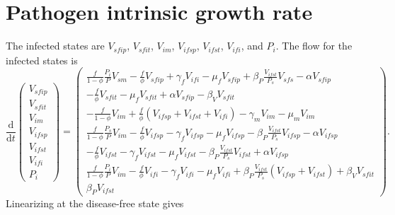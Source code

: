 \documentclass{article}
\newcommand{\md}{\mathrm{d}}
\begin{document}
\section{Pathogen intrinsic growth rate}

The infected states are $V_{sfip}$, $V_{sfit}$, $V_{im}$, $V_{ifsp}$,
$V_{ifst}$, $V_{ifi}$, and $P_i$.
The flow for the infected states is
\begin{equation}
  \frac{\md}{\md t}
  \begin{pmatrix}
    V_{sfip}
    \\
    V_{sfit}
    \\
    V_{im}
    \\
    V_{ifsp}
    \\
    V_{ifst}
    \\
    V_{ifi}
    \\
    P_i
  \end{pmatrix}
  =
  \begin{pmatrix}
    \frac{f}{1 - \phi} \frac{P_i}{P} V_{sm}
    - \frac{f}{\phi} V_{sfip}
    + \gamma_f V_{ifi}
    - \mu_f V_{sfip}
    + \beta_P \frac{V_{ifst}}{P_s} V_{sfs}
    - \alpha V_{sfip}
    \\
    - \frac{f}{\phi} V_{sfit}
    - \mu_f V_{sfit}
    + \alpha V_{sfip}
    - \beta_V V_{sfit}
    \\
    - \frac{f}{1 - \phi} V_{im}
    + \frac{f}{\phi} (V_{ifsp} + V_{ifst} + V_{ifi})
    - \gamma_m V_{im}
    - \mu_m V_{im}
    \\
    \frac{f}{1 - \phi} \frac{P_s}{P} V_{im}
    - \frac{f}{\phi} V_{ifsp}
    - \gamma_f V_{ifsp}
    - \mu_f V_{ifsp}
    - \beta_P \frac{V_{ifst}}{P_s} V_{ifsp}
    - \alpha V_{ifsp}
    \\
    - \frac{f}{\phi} V_{ifst}
    - \gamma_f V_{ifst}
    - \mu_f V_{ifst}
    - \beta_P \frac{V_{ifst}}{P_s} V_{ifst}
    + \alpha V_{ifsp}
    \\
    \frac{f}{1 - \phi} \frac{P_i}{P} V_{im}
    - \frac{f}{\phi} V_{ifi}
    - \gamma_f V_{ifi}
    - \mu_f V_{ifi}
    + \beta_P \frac{V_{ifst}}{P_s} (V_{ifsp} + V_{ifst})
    + \beta_V V_{sfit}
    \\
    \beta_P V_{ifst}
  \end{pmatrix}.
\end{equation}
Linearizing at the disease-free state gives
\end{document}

